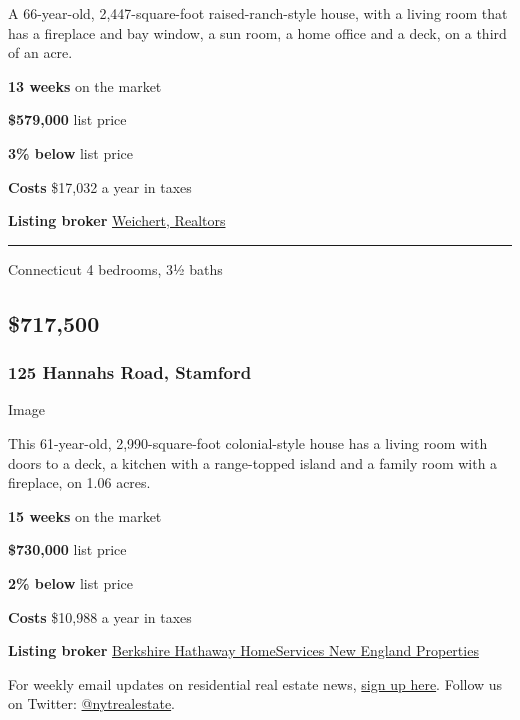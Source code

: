 A 66-year-old, 2,447-square-foot raised-ranch-style house, with a living
room that has a fireplace and bay window, a sun room, a home office and
a deck, on a third of an acre.

\textbf{13 weeks} on the market

\textbf{\$579,000} list price

\textbf{3\% below} list price

\textbf{Costs} \$17,032 a year in taxes

\textbf{Listing broker}
\href{https://www.zillow.com/homedetails/15-Rock-Spring-Rd-West-Orange-NJ-07052/38750723_zpid/}{Weichert,
Realtors}

\begin{center}\rule{0.5\linewidth}{\linethickness}\end{center}

Connecticut \textbar{} 4 bedrooms, 3½ baths

\hypertarget{717500}{%
\subsection{\$717,500}\label{717500}}

\hypertarget{125-hannahs-road-stamford}{%
\subsubsection{\texorpdfstring{\textbf{125 Hannahs Road,
Stamford}}{125 Hannahs Road, Stamford}}\label{125-hannahs-road-stamford}}

Image

This 61-year-old, 2,990-square-foot colonial-style house has a living
room with doors to a deck, a kitchen with a range-topped island and a
family room with a fireplace, on 1.06 acres.

\textbf{15 weeks} on the market

\textbf{\$730,000} list price

\textbf{2\% below} list price

\textbf{Costs} \$10,988 a year in taxes

\textbf{Listing broker}
\href{https://www.bhhsneproperties.com/single-family/smt/170282992/125-hannahs-road-stamford-ct-06903}{Berkshire
Hathaway HomeServices New England Properties}

For weekly email updates on residential real estate news,
\href{http://www.nytimes3xbfgragh.onion/newsletters/realestate/}{sign up
here}. Follow us on Twitter:
\href{https://twitter.com/nytrealestate}{@nytrealestate}.

